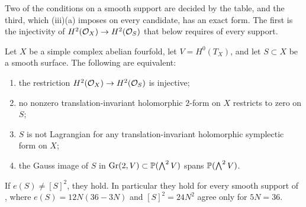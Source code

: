 Two of the conditions on a smooth support are decided by the table, and the
third, which (iii)(a) imposes on every candidate, has an
exact form. The first is the injectivity of $H^{2}(\mathcal{O}_{X})\to H^{2}(\mathcal{O}_{S})$
that  below requires of every support.

\begin{lemma}
\label{lem:smoothinjective}
Let $X$ be a simple complex abelian fourfold, let $V=H^{0}(T_{X})$, and let
$S\subset X$ be a smooth surface. The following are equivalent:
\begin{enumerate}[label=\textup{(\roman*)},nosep,leftmargin=2.2em]
\item the restriction $H^{2}(\mathcal{O}_{X})\to H^{2}(\mathcal{O}_{S})$ is injective;
\item no nonzero translation-invariant holomorphic $2$-form on $X$ restricts
  to zero on $S$;
\item $S$ is not Lagrangian for any translation-invariant holomorphic
  symplectic form on $X$;
\item the Gauss image of $S$ in $\operatorname{Gr}(2,V)\subset\mathbb{P}(\bigwedge^{2}V)$
  spans $\mathbb{P}(\bigwedge^{2}V)$.
\end{enumerate}
If $e(S)\ne[S]^{2}$, they hold. In particular they hold for every smooth
support of , where $e(S)=12N(36-3N)$ and
$[S]^{2}=24N^{2}$ agree only for $5N=36$.
\end{lemma}

